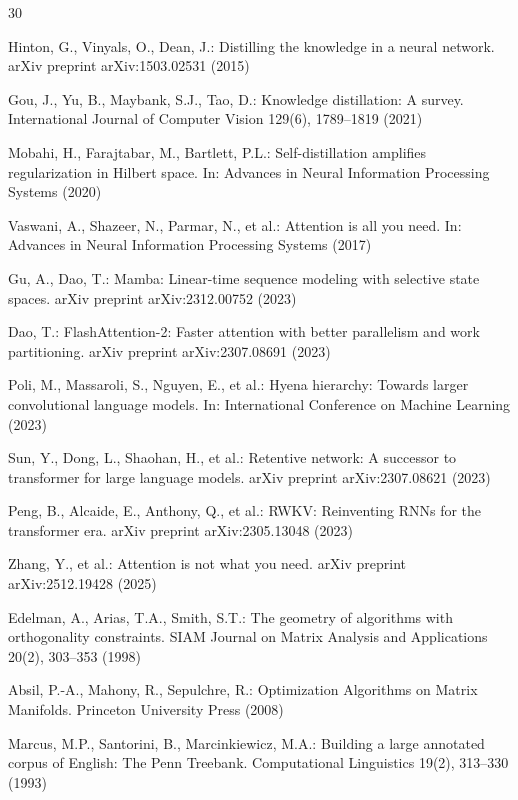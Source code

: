 \documentclass[conference]{IEEEtran}
\begin{document}
\small
\begin{thebibliography}{30}

Hinton, G., Vinyals, O., Dean, J.: Distilling the knowledge in a neural
network. arXiv preprint arXiv:1503.02531 (2015)

Gou, J., Yu, B., Maybank, S.J., Tao, D.: Knowledge distillation: A survey.
International Journal of Computer Vision 129(6), 1789--1819 (2021)

Mobahi, H., Farajtabar, M., Bartlett, P.L.: Self-distillation amplifies
regularization in Hilbert space. In: Advances in Neural Information Processing
Systems (2020)

Vaswani, A., Shazeer, N., Parmar, N., et al.: Attention is all you need.
In: Advances in Neural Information Processing Systems (2017)

Gu, A., Dao, T.: Mamba: Linear-time sequence modeling with selective
state spaces. arXiv preprint arXiv:2312.00752 (2023)

Dao, T.: FlashAttention-2: Faster attention with better parallelism and
work partitioning. arXiv preprint arXiv:2307.08691 (2023)

Poli, M., Massaroli, S., Nguyen, E., et al.: Hyena hierarchy: Towards
larger convolutional language models. In: International Conference on
Machine Learning (2023)

Sun, Y., Dong, L., Shaohan, H., et al.: Retentive network: A successor to
transformer for large language models. arXiv preprint arXiv:2307.08621 (2023)

Peng, B., Alcaide, E., Anthony, Q., et al.: RWKV: Reinventing RNNs for
the transformer era. arXiv preprint arXiv:2305.13048 (2023)

Zhang, Y., et al.: Attention is not what you need.
arXiv preprint arXiv:2512.19428 (2025)

Edelman, A., Arias, T.A., Smith, S.T.: The geometry of algorithms with
orthogonality constraints. SIAM Journal on Matrix Analysis and Applications
20(2), 303--353 (1998)

Absil, P.-A., Mahony, R., Sepulchre, R.: Optimization Algorithms on
Matrix Manifolds. Princeton University Press (2008)

Marcus, M.P., Santorini, B., Marcinkiewicz, M.A.: Building a large
annotated corpus of English: The Penn Treebank.
Computational Linguistics 19(2), 313--330 (1993)


\end{thebibliography}
\end{document}

